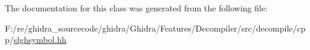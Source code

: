 The documentation for this class was generated from the following file\+:\begin{DoxyCompactItemize}
\item 
F\+:/re/ghidra\+\_\+sourcecode/ghidra/\+Ghidra/\+Features/\+Decompiler/src/decompile/cpp/\mbox{\hyperlink{slghsymbol_8hh}{slghsymbol.\+hh}}\end{DoxyCompactItemize}
